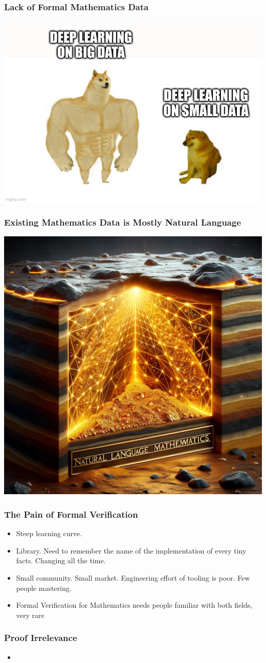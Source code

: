 \documentclass{beamer}   	%
\theoremstyle{definition}
\begin{document}
\begin{frame}
\frametitle{Lack of Formal Mathematics Data}
\includegraphics[width=\linewidth]{images/dl_data.jpg}
\end{frame}

\begin{frame}
\frametitle{Existing Mathematics Data is Mostly Natural Language}
\begin{center}
\includegraphics[width=0.7\linewidth]{images/math_gold_mine.png}
\end{center}
\end{frame}

\begin{frame}
\frametitle{The Pain of Formal Verification}
\begin{itemize}
	\item Steep learning curve.
	\item Library. Need to remember the name of the implementation of every tiny facts. Changing all the time.
	\item Small community. Small market. Engineering effort of tooling is poor. Few people mastering.
	\item Formal Verification for Mathematics needs people familiar with both fields, very rare
\end{itemize}
\end{frame}

\begin{frame}
\frametitle{Proof Irrelevance}
\begin{itemize}
	\item 
\end{itemize}
\end{frame}
\end{document}
